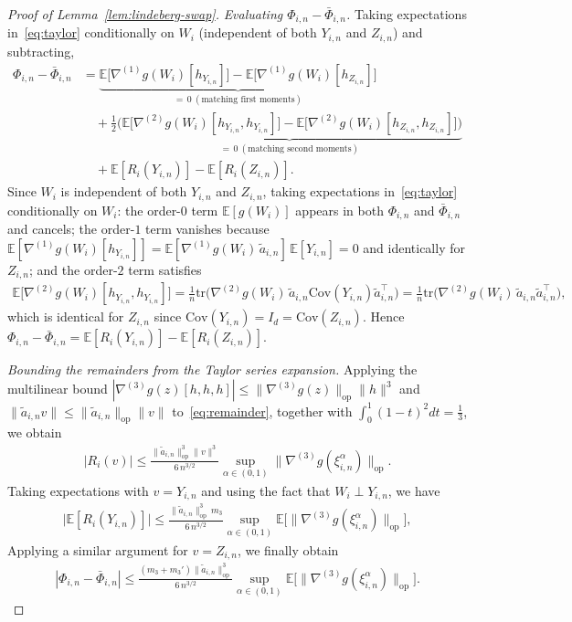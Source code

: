 \documentclass[10pt,a4paper]{amsart}
\newcommand{\Ee}{{\mathbb{E}}}
\newcommand{\op}{\mathrm{op}}
\begin{document}
\begin{proof}[Proof of Lemma~\ref{lem:lindeberg-swap}]
\medskip\noindent\textit{Evaluating $\Phi_{i,n}-\bar\Phi_{i,n}$.}
Taking expectations in~\eqref{eq:taylor} conditionally on $W_i$ (independent
of both $Y_{i,n}$ and $Z_{i,n}$) and subtracting,
\begin{align*}
  \Phi_{i,n}-\bar\Phi_{i,n}
  &=\underbrace{\Ee\big[\nabla^{(1)}g(W_i)[h_{Y_{i,n}}]\big]
               -\Ee\big[\nabla^{(1)}g(W_i)[h_{Z_{i,n}}]\big]}_{=\,0
               \ (\text{matching first moments})}\\
  &\quad
   +\tfrac12\underbrace{\Big(\Ee\big[\nabla^{(2)}g(W_i)[h_{Y_{i,n}},h_{Y_{i,n}}]\big]
               -\Ee\big[\nabla^{(2)}g(W_i)[h_{Z_{i,n}},h_{Z_{i,n}}]\big]\Big)}_{=\,0
               \ (\text{matching second moments})}\\
  &\quad
   +\Ee[R_i(Y_{i,n})]-\Ee[R_i(Z_{i,n})].
\end{align*}
Since $W_i$ is independent of both $Y_{i,n}$ and $Z_{i,n}$, taking
expectations in~\eqref{eq:taylor} conditionally on $W_i$:
the order-$0$ term $\Ee[g(W_i)]$ appears in both $\Phi_{i,n}$ and
$\bar\Phi_{i,n}$ and cancels; the order-$1$ term vanishes because
$\Ee[\nabla^{(1)}g(W_i)[h_{Y_{i,n}}]]
=\Ee[\nabla^{(1)}g(W_i)\,\widetilde a_{i,n}]\,\Ee[Y_{i,n}]=0$ and
identically for $Z_{i,n}$; and the order-$2$ term satisfies
\begin{align*}
  \Ee\big[\nabla^{(2)}g(W_i)[h_{Y_{i,n}},h_{Y_{i,n}}]\big]
  =\frac1n\mathrm{tr}\big(\nabla^{(2)}g(W_i)\,
    \widetilde a_{i,n}\mathrm{Cov}(Y_{i,n})\widetilde a_{i,n}^\top\big)
  =\frac1n\mathrm{tr}\big(\nabla^{(2)}g(W_i)\,
    \widetilde a_{i,n}\widetilde a_{i,n}^\top\big),
\end{align*}
which is identical for $Z_{i,n}$ since
$\mathrm{Cov}(Y_{i,n})=I_d=\mathrm{Cov}(Z_{i,n})$. Hence
$\Phi_{i,n}-\bar\Phi_{i,n}=\Ee[R_i(Y_{i,n})]-\Ee[R_i(Z_{i,n})]$.

\medskip\noindent\textit{Bounding the remainders from the Taylor series expansion.}
Applying the multilinear bound
$|\nabla^{(3)}g(z)[h,h,h]|\le\|\nabla^{(3)}g(z)\|_{\op}\|h\|^3$ and
$\|\widetilde a_{i,n}v\|\le\|\widetilde a_{i,n}\|_{\op}\|v\|$
to~\eqref{eq:remainder}, together with $\int_0^1(1-t)^2dt=\tfrac13$, we obtain
\begin{align*}
  |R_i(v)|
  \le\frac{\|\widetilde a_{i,n}\|_{\op}^3\|v\|^3}{6\,n^{3/2}}
     \sup_{\alpha\in(0,1)}\|\nabla^{(3)}g(\xi^\alpha_{i,n})\|_{\op}.
\end{align*}
Taking expectations with $v=Y_{i,n}$ and using the fact that
$W_i\perp Y_{i,n}$, we have
\begin{align}
  \label{eq:Ri-bound}
  \big|\Ee[R_i(Y_{i,n})]\big|
  \le\frac{\|\widetilde a_{i,n}\|_{\op}^3\,m_3}{6\,n^{3/2}}
     \sup_{\alpha\in(0,1)}\Ee\big[\|\nabla^{(3)}g(\xi^\alpha_{i,n})\|_{\op}\big],
\end{align}
Applying a similar argument for $v=Z_{i,n}$, we finally obtain
\begin{align*}
  |\Phi_{i,n}-\bar\Phi_{i,n}|
  \le\frac{(m_3+m_3')\|\widetilde a_{i,n}\|_{\op}^3}{6\,n^{3/2}}
     \sup_{\alpha\in(0,1)}\Ee\big[\|\nabla^{(3)}g(\xi^\alpha_{i,n})\|_{\op}\big].
\end{align*}


\end{proof}
\end{document}
